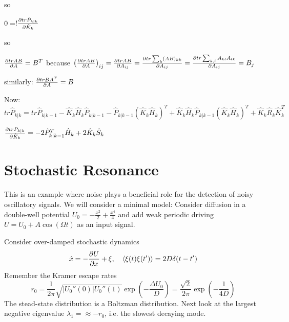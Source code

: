 \documentclass{notebook}
\begin{document}
so

$0 =! \pdv{tr \hat{P}_{k|k}}{\hat{K}_k}$

so

$\pdv{tr AB}{A} = B^T$ because $\left( \pdv{tr AB}{A} \right)_{ij} = \pdv{tr AB}{A_{ij}} = \pdv{tr \sum_k (AB)_{kk}}{A_{ij}} = \pdv{tr \sum_{k,l} A_{kl}A_{lk}}{A_{ij}} = B_j$

similarly: $\pdv{tr BA^T}{A} = B$

Now: $tr \hat{P}_{k|k} = tr \hat{P}_{k|k-1} - \hat{K}_k \hat{H}_k \hat{P}_{k|k-1} - \hat{P}_{k|k-1}(\hat{K}_k \hat{H}_k)^T 
+ \hat{K}_k \hat{H}_k \hat{P}_{k|k-1} (\hat{K}_k \hat{H}_k)^T + \hat{K}_k \hat{R}_k\hat{K}^T_k$

$\pdv{tr P_{k|k}}{\hat{K}_k} = - 2 \hat{P}^T_{k|k-1} \hat{H}_k + 2 \hat{K}_k \hat{S}_k$

\chapter{Stochastic Resonance}

This is an example where noise plays a beneficial role for the detection of noisy oscillatory signals. We will consider a minimal model: Consider diffusion in a double-well potential $U_0 = - \frac{x^2}{2} + \frac{x^4}{4}$ and add weak periodic driving $U = U_0 + A \cos(\Omega t)$ as an input signal. 

Consider over-damped stochastic dynamics
%
\begin{equation}
	\dot{x} = -\pdv{U}{x} + \xi, \quad \expval{\xi(t) \xi(t')} = 2 D \delta(t-t')
\end{equation}
%
Remember the Kramer escape rates
%
\begin{equation}
	r_0 = \frac{1}{2 \pi} \sqrt{|U_0''(0)| U_0''(1)} \exp(-\frac{\Delta U_0}{D}) = \frac{\sqrt{2}}{2 \pi} \exp(-\frac{1}{4D})
\end{equation}
%
The stead-state distribution is a Boltzman distribution. Next look at the largest negative eigenvalue $\lambda_1 = \approx -r_0$, i.e. the slowest decaying mode. 
\end{document}

